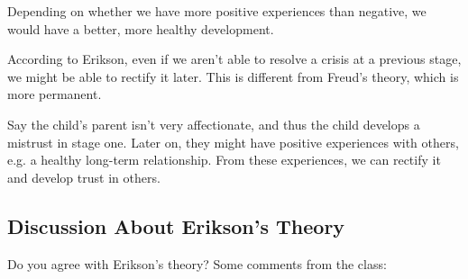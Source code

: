 \documentclass[../main/main.tex]{subfiles}
\begin{document}
\begin{remark}
Depending on whether we have more positive experiences than negative, we would have a better, more healthy development.
\end{remark}
\begin{remark}
  According to Erikson, even if we aren't able to resolve a crisis at a previous stage, we might be able to rectify it later. This is different from Freud's theory, which is more permanent.
\end{remark}
\begin{example}
Say the child's parent isn't very affectionate, and thus the child develops a mistrust in stage one. Later on, they might have positive experiences with others, e.g. a healthy long-term relationship. From these experiences, we can rectify it and develop trust in others.
\end{example}
\subsection{Discussion About Erikson's Theory}
Do you agree with Erikson's theory? Some comments from the class:
\end{document}
